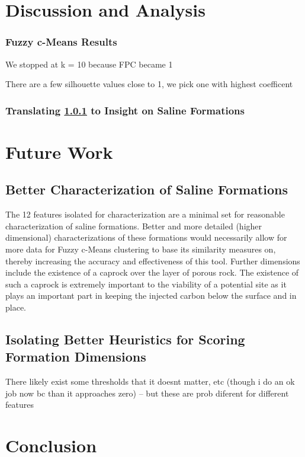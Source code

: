 \documentclass[letterpaper, 12pt]{article}
\begin{document}
\section{Discussion and Analysis}
\subsubsection{Fuzzy c-Means Results}\label{fcmr}

We stopped at k = 10 because FPC became 1


There are a few silhouette values close to 1, we pick one with highest coefficent 
\subsubsection{Translating \ref{fcmr} to Insight on Saline Formations} 

\section{Future Work}
\subsection{Better Characterization of Saline Formations}\cite{betterchar}
The 12 features isolated for characterization are a minimal set for reasonable characterization of saline formations. Better and more detailed (higher dimensional) characterizations of these formations would necessarily allow for more data for Fuzzy c-Means clustering to base its similarity measures on, thereby increasing the accuracy and effectiveness of this tool. Further dimensions include the existence of a caprock over the layer of porous rock. The existence of such a caprock is extremely important to the viability of a potential site as it plays an important part in keeping the injected carbon below the surface and in place.  

\subsection{Isolating Better Heuristics for Scoring Formation Dimensions}
There likely exist some thresholds that it doesnt matter, etc (though i do an ok job now bc than it approaches zero) -- but these are prob diferent for different features
\section{Conclusion}
\end{document}
